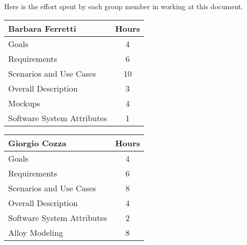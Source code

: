 Here is the effort spent by each group member in working at this document.

\begin{table}[H]
\begin{tabular}{|l|c|}
\hline
\textbf{Barbara Ferretti} & \multicolumn{1}{l|}{\textbf{Hours}} \\ \hline
Goals                     & 4                                   \\ \hline
Requirements              &  6                                \\ \hline
Scenarios and Use Cases   & 10                                  \\ \hline
Overall Description       & 3                                   \\ \hline
Mockups                   & 4                                   \\ \hline
Software System Attributes                   & 1                                   \\ \hline
\end{tabular}
\end{table}

\begin{table}[H]
	\begin{tabular}{|l|c|}
		\hline
		\textbf{Giorgio Cozza} & \multicolumn{1}{l|}{\textbf{Hours}} \\ \hline
		Goals                     &  4      \\ \hline
		Requirements              &  6      \\ \hline
		Scenarios and Use Cases   &  8      \\ \hline
		Overall Description       &  4      \\ \hline
		Software System Attributes&  2      \\ \hline
		Alloy Modeling            &  8      \\ \hline
	\end{tabular}
\end{table}


